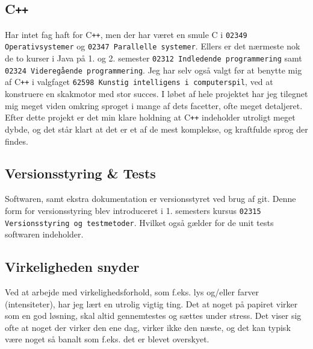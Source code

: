 \subsection{C\texttt{++}}
Har intet fag haft for C\texttt{++}, men der har været en smule C i \texttt{02349 Operativsystemer} og \texttt{02347 Parallelle systemer}. Ellers er det nærmeste nok de to kurser i Java på 1. og 2. semester \texttt{02312 Indledende programmering} samt \texttt{02324 Videregående programmering}.
Jeg har selv også valgt før at benytte mig af C\texttt{++} i valgfaget \texttt{62598 Kunstig intelligens i computerspil}, ved at konstruere en skakmotor med stor succes.
I løbet af hele projektet har jeg tilegnet mig meget viden omkring sproget i mange af dets facetter, ofte meget detaljeret. Efter dette projekt er det min klare holdning at C\texttt{++} indeholder utroligt meget dybde, og det står klart at det er et af de mest komplekse, og kraftfulde sprog der findes.

\subsection{Versionsstyring \& Tests}
Softwaren, samt ekstra dokumentation er versionsstyret ved brug af git. Denne form for versionsstyring blev introduceret i 1. semesters kursus \texttt{02315 Versionsstyring og testmetoder}. Hvilket også gælder for de unit tests softwaren indeholder.

\subsection{Virkeligheden snyder}
Ved at arbejde med virkelighedsforhold, som f.eks. lys og/eller farver (intensiteter), har jeg lært en utrolig vigtig ting. Det at noget på papiret virker som en god løsning, skal altid gennemtestes og sættes under stress.
Det viser sig ofte at noget der virker den ene dag, virker ikke den næste, og det kan typisk være noget så banalt som f.eks. det er blevet overskyet.
